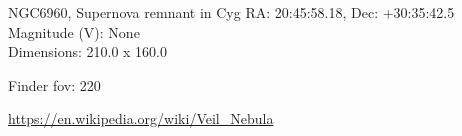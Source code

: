 \begin{block}{NGC6960, Supernova remnant in Cyg}
    RA: 20:45:58.18, Dec: +30:35:42.5 \\ 
    Magnitude (V): None \\ 
    Dimensions: 210.0 x 160.0 

    Finder fov: 220 

    \url{https://en.wikipedia.org/wiki/Veil_Nebula} 
\end{block}